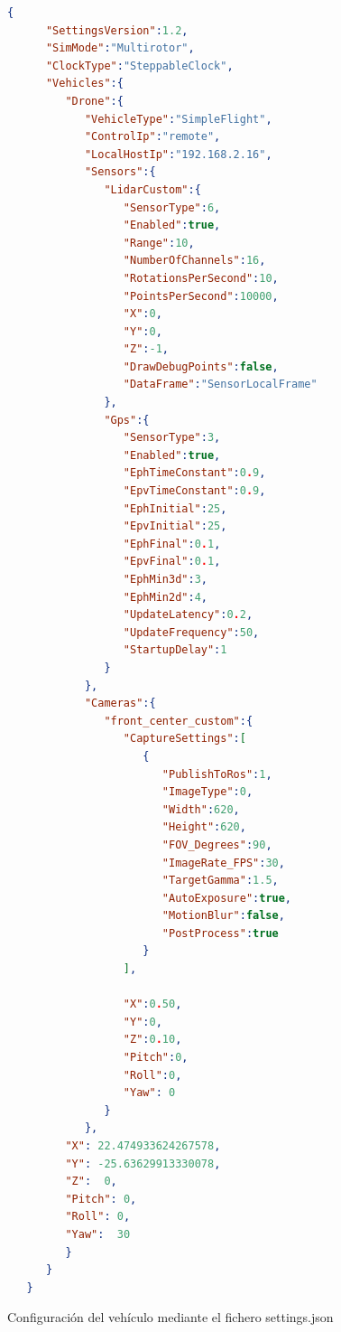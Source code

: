 \begin{code}[H]
  \begin{lstlisting}[language=json,basicstyle=\tiny]
    {
      "SettingsVersion":1.2,
      "SimMode":"Multirotor",
      "ClockType":"SteppableClock",
      "Vehicles":{
         "Drone":{
            "VehicleType":"SimpleFlight",
            "ControlIp":"remote",
            "LocalHostIp":"192.168.2.16",
            "Sensors":{
               "LidarCustom":{
                  "SensorType":6,
                  "Enabled":true,
                  "Range":10,
                  "NumberOfChannels":16,
                  "RotationsPerSecond":10,
                  "PointsPerSecond":10000,
                  "X":0,
                  "Y":0,
                  "Z":-1,
                  "DrawDebugPoints":false,
                  "DataFrame":"SensorLocalFrame"
               },
               "Gps":{
                  "SensorType":3,
                  "Enabled":true,
                  "EphTimeConstant":0.9,
                  "EpvTimeConstant":0.9,
                  "EphInitial":25,
                  "EpvInitial":25,
                  "EphFinal":0.1,
                  "EpvFinal":0.1,
                  "EphMin3d":3,
                  "EphMin2d":4,
                  "UpdateLatency":0.2,
                  "UpdateFrequency":50,
                  "StartupDelay":1
               }
            },
            "Cameras":{
               "front_center_custom":{
                  "CaptureSettings":[
                     {
                        "PublishToRos":1,
                        "ImageType":0,
                        "Width":620,
                        "Height":620,
                        "FOV_Degrees":90,
                        "ImageRate_FPS":30,
                        "TargetGamma":1.5,
                        "AutoExposure":true,
                        "MotionBlur":false,
                        "PostProcess":true
                     }
                  ],
                 
                  "X":0.50,
                  "Y":0,
                  "Z":0.10,
                  "Pitch":0,
                  "Roll":0,
                  "Yaw": 0
               }
            },
         "X": 22.474933624267578,
         "Y": -25.63629913330078,
         "Z":  0,
         "Pitch": 0,
         "Roll": 0,
         "Yaw":  30
         }
      }
   }

  \end{lstlisting}
  \caption[Configuración del vehículo mediante el fichero settings.json]{Configuración del vehículo mediante el fichero settings.json}
  \label{cod:settings}
  \end{code}  

